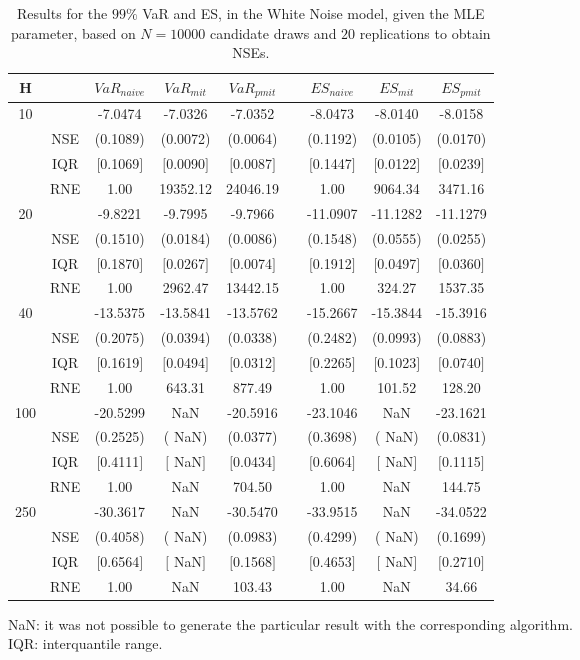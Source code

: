 \footnotesize{  
{ \renewcommand{\arraystretch}{1.3} 
\begin{table}[h] 
\centering 
\caption{Results for the $99\%$ VaR and ES, in the White Noise model, given the MLE parameter, based on $N=10000$ candidate draws and $20$ replications to obtain NSEs.} 
\label{tab:res_algos_WN_ML} 
\begin{tabular}{ccccccccc}  
 H & & $VaR_{naive}$ & $VaR_{mit}$ & $VaR_{pmit}$ &  & $ES_{naive}$ & $ES_{mit}$ & $ES_{pmit}$ \\ \hline 
10 & & -7.0474 & -7.0326 & -7.0352 & & -8.0473 & -8.0140 & -8.0158  \\ 
  & NSE & (0.1089) & (0.0072) & (0.0064) & & (0.1192) & (0.0105) & (0.0170)   \\ 
 & IQR & $[$0.1069$]$ & $[$0.0090$]$ & $[$0.0087$]$ & & $[$0.1447$]$ & $[$0.0122$]$ & $[$0.0239$]$  \\  
  & RNE &   1.00 & 19352.12 & 24046.19 & &   1.00 & 9064.34 & 3471.16   \\ [1ex] 
20 & & -9.8221 & -9.7995 & -9.7966 & & -11.0907 & -11.1282 & -11.1279  \\ 
  & NSE & (0.1510) & (0.0184) & (0.0086) & & (0.1548) & (0.0555) & (0.0255)   \\ 
 & IQR & $[$0.1870$]$ & $[$0.0267$]$ & $[$0.0074$]$ & & $[$0.1912$]$ & $[$0.0497$]$ & $[$0.0360$]$  \\  
  & RNE &   1.00 & 2962.47 & 13442.15 & &   1.00 & 324.27 & 1537.35   \\ [1ex] 
40 & & -13.5375 & -13.5841 & -13.5762 & & -15.2667 & -15.3844 & -15.3916  \\ 
  & NSE & (0.2075) & (0.0394) & (0.0338) & & (0.2482) & (0.0993) & (0.0883)   \\ 
 & IQR & $[$0.1619$]$ & $[$0.0494$]$ & $[$0.0312$]$ & & $[$0.2265$]$ & $[$0.1023$]$ & $[$0.0740$]$  \\  
  & RNE &   1.00 & 643.31 & 877.49 & &   1.00 & 101.52 & 128.20   \\ [1ex] 
100 & & -20.5299 &    NaN & -20.5916 & & -23.1046 &    NaN & -23.1621  \\ 
  & NSE & (0.2525) & (   NaN) & (0.0377) & & (0.3698) & (   NaN) & (0.0831)   \\ 
 & IQR & $[$0.4111$]$ & $[$   NaN$]$ & $[$0.0434$]$ & & $[$0.6064$]$ & $[$   NaN$]$ & $[$0.1115$]$  \\  
  & RNE &   1.00 &    NaN & 704.50 & &   1.00 &    NaN & 144.75   \\ [1ex] 
250 & & -30.3617 &    NaN & -30.5470 & & -33.9515 &    NaN & -34.0522  \\ 
  & NSE & (0.4058) & (   NaN) & (0.0983) & & (0.4299) & (   NaN) & (0.1699)   \\ 
 & IQR & $[$0.6564$]$ & $[$   NaN$]$ & $[$0.1568$]$ & & $[$0.4653$]$ & $[$   NaN$]$ & $[$0.2710$]$  \\  
  & RNE &   1.00 &    NaN & 103.43 & &   1.00 &    NaN &  34.66   \\ [1ex] 
\hline 
\end{tabular} 
\raggedright 

\vspace{5pt}\footnotesize{NaN: it was not possible to generate the particular result with the corresponding algorithm.} \\ 
\vspace{5pt}\footnotesize{IQR: interquantile range.} 
\end{table} 
} 
} 
